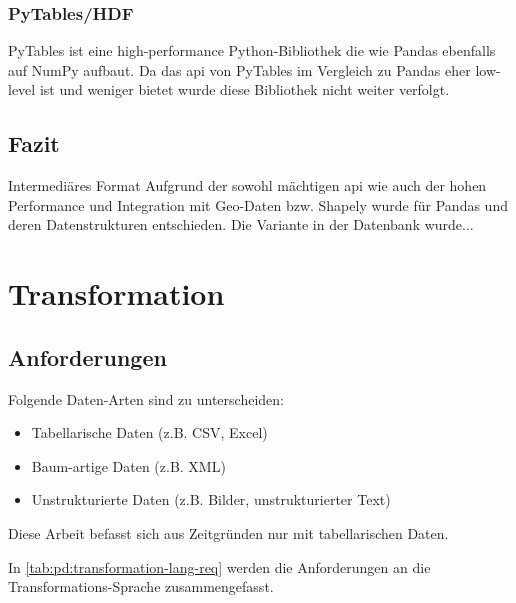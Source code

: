 \subsubsection{PyTables/HDF}
PyTables ist eine high-performance Python-Bibliothek die wie Pandas ebenfalls auf NumPy aufbaut. Da das \acs{api} von PyTables im Vergleich zu Pandas eher low-level ist und weniger bietet wurde diese Bibliothek nicht weiter verfolgt.

\subsection{Fazit}


\begin{decision}[label=dec:pd:format]{Intermediäres Format}
Aufgrund der sowohl mächtigen \acs{api} wie auch der hohen Performance und Integration mit Geo-Daten bzw. Shapely wurde für Pandas und deren Datenstrukturen entschieden. Die Variante in der Datenbank wurde...
\end{decision}

\section{Transformation}

\subsection{Anforderungen}
Folgende Daten-Arten sind zu unterscheiden:
\begin{itemize}
\item Tabellarische Daten (z.B. CSV, Excel)
\item Baum-artige Daten (z.B. XML)
\item Unstrukturierte Daten (z.B. Bilder, unstrukturierter Text)
\end{itemize}

Diese Arbeit befasst sich aus Zeitgründen nur mit tabellarischen Daten.

In \cref{tab:pd:transformation-lang-req} werden die Anforderungen an die Transformations-Sprache zusammengefasst.

